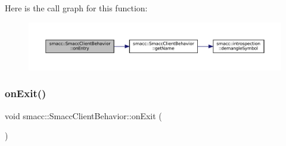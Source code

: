 Here is the call graph for this function\+:
\nopagebreak
\begin{figure}[H]
\begin{center}
\leavevmode
\includegraphics[width=350pt]{classsmacc_1_1SmaccClientBehavior_a7962382f93987c720ad432fef55b123f_cgraph}
\end{center}
\end{figure}
\mbox{\label{classsmacc_1_1SmaccClientBehavior_ac0cd72d42bd00425362a97c9803ecce5}} 
\subsubsection{\texorpdfstring{on\+Exit()}{onExit()}}
{\footnotesize\ttfamily void smacc\+::\+Smacc\+Client\+Behavior\+::on\+Exit (\begin{DoxyParamCaption}{ }\end{DoxyParamCaption})\hspace{0.3cm}{\ttfamily [virtual]}}



